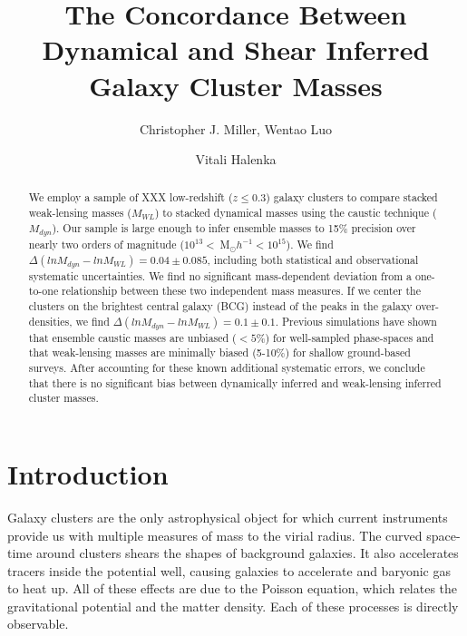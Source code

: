 \documentclass[apj]{emulateapj}
\begin{document}
\title{The Concordance Between Dynamical and Shear Inferred Galaxy Cluster Masses}

\author{Christopher J. Miller, Wentao Luo \and Vitali Halenka}


\begin{abstract}

We employ a sample of XXX low-redshift ($z \le 0.3$) galaxy clusters to compare stacked weak-lensing masses ($M_{WL}$) to stacked dynamical masses using the caustic technique ($M_{dyn}$). Our sample is large enough to infer ensemble masses to 15\% precision over nearly two orders of magnitude ($10^{13} <~     $M$_{\odot}h^{-1} < 10^{15}$). We find $\Delta(lnM_{dyn} - lnM_{WL}) = 0.04 \pm{0.085}$, including both statistical and observational systematic uncertainties. We find no significant mass-dependent deviation from a one-to-one relationship between these two independent mass measures. If we center the clusters on the brightest central galaxy (BCG) instead of the peaks in the galaxy over-densities, we find $\Delta(lnM_{dyn} - lnM_{WL}) = 0.1 \pm{0.1}$. Previous simulations have shown that ensemble caustic masses are unbiased ($<5$\%) for well-sampled phase-spaces and that weak-lensing masses are minimally biased (5-10\%) for shallow ground-based surveys. After accounting for these known additional systematic errors, we conclude that there is no significant bias between dynamically inferred and weak-lensing inferred cluster masses.
\end{abstract}

\maketitle


\section{Introduction}
Galaxy clusters are the only astrophysical object for which current instruments provide us with multiple measures of mass to the virial radius. The curved space-time around clusters shears the shapes of background galaxies. It also accelerates tracers inside the potential well, causing galaxies to accelerate and baryonic gas to heat up. All of these effects are due to the Poisson equation, which relates the gravitational potential and the matter density. Each of these processes is directly observable.
\end{document}
